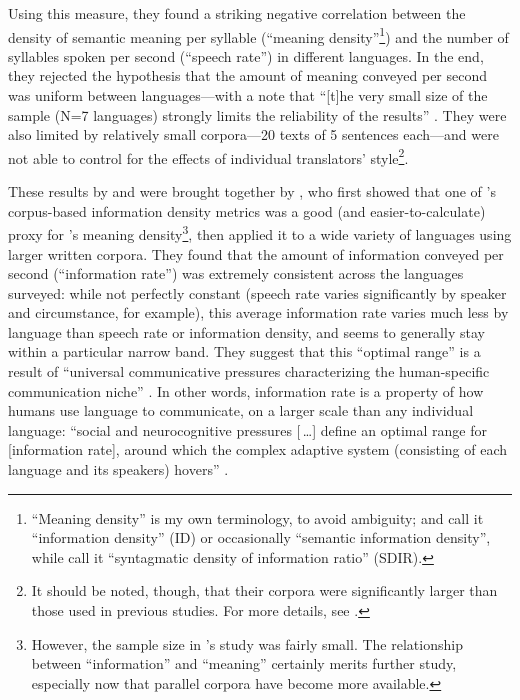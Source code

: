 \documentclass[12pt,twoside]{article}
\begin{document}
Using this measure, they found a striking negative correlation between the density of semantic meaning per syllable (``meaning density''\footnote{``Meaning density'' is my own terminology, to avoid ambiguity; \citet{pellegrino} and \citet{oh} call it ``information density'' (ID) or occasionally ``semantic information density'', while \citet{coupé} call it ``syntagmatic density of information ratio'' (SDIR).}) and the number of syllables spoken per second (``speech rate'') in different languages. In the end, they rejected the hypothesis that the amount of meaning conveyed per second was uniform between languages---with a note that ``[t]he very small size of the sample (N=7 languages) strongly limits the reliability of the results'' \citep[550]{pellegrino}. They were also limited by relatively small corpora---20 texts of 5 sentences each---and were not able to control for the effects of individual translators' style\footnote{It should be noted, though, that their corpora were significantly larger than those used in previous studies. For more details, see \citereset\cite[545]{pellegrino}.}.

These results by \citet{oh} and \citet{pellegrino} were brought together by \citet{coupé}, who first showed that one of \citeauthor{oh}'s corpus-based information density metrics was a good (and easier-to-calculate) proxy for \citeauthor{pellegrino}'s meaning density\footnote{However, the sample size in \citeauthor{pellegrino}'s study was fairly small. The relationship between ``information'' and ``meaning'' certainly merits further study, especially now that parallel corpora have become more available.}, then applied it to a wide variety of languages using larger written corpora. They found that the amount of information conveyed per second (``information rate'') was extremely consistent across the languages surveyed: while not perfectly constant (speech rate varies significantly by speaker and circumstance, for example), this average information rate varies much less by language than speech rate or information density, and seems to generally stay within a particular narrow band. They suggest that this ``optimal range'' is a result of ``universal communicative pressures characterizing the human-specific communication niche'' \citep[6]{coupé}. In other words, information rate is a property of how humans use language to communicate, on a larger scale than any individual language: ``social and neurocognitive pressures [\,\ldots] define an optimal range for [information rate], around which the complex adaptive system (consisting of each language and its speakers) hovers'' \citep[6]{coupé}.
\end{document}
